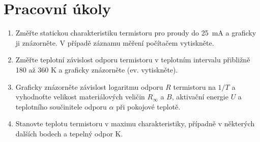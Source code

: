 \documentclass[a4paper]{article}
\author{Vladislav Wohlrath}
\begin{document}
\begin{titlepage}
%
\end{titlepage}

\section*{Pracovní úkoly}
\begin{enumerate}
\item Změřte statickou charakteristiku termistoru pro proudy do \SI{25}{\milli\ampere} a graficky ji znázorněte. V případě záznamu měření počítačem vytiskněte.
\item Změřte teplotní závislost odporu termistoru v teplotním intervalu přibližně 180 až 360 K a graficky znázorněte (ev. vytiskněte).
\item Graficky znázorněte závislost logaritmu odporu $R$ termistoru na $1/T$ a vyhodnoťte velikost materiálových veličin $R_{\infty}$ a $B$, aktivační energie $U$ a teplotního součinitele odporu $\alpha$ při pokojové teplotě.
\item Stanovte teplotu termistoru v maximu charakteristiky, případně v některých dalších bodech a tepelný odpor K.
\end{enumerate}










\printbibliography[title={Seznam použité literatury}]
\end{document}
